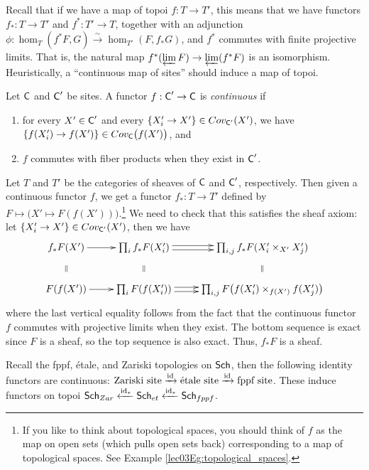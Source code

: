 
 Recall that if we have a map of topoi $f:T\to T'$, this means that we have functors
 $f_*:T\to T'$ and $f^*:T'\to T$, together with an adjunction
 $\phi:\hom_T(f^*F,G)\xrightarrow{\sim} \hom_{T'}(F,f_*G)$, and $f^*$ commutes with
 finite projective limits. That is, the natural map $f^* (\varprojlim F)\to
 \varprojlim(f^*F)$ is an isomorphism. Heuristically, a ``continuous map of sites''
 should induce a map of topoi.

 \begin{definition}
   Let $\text{\sf C}$ and $\text{\sf C}'$ be sites. A functor $f:\text{\sf C}'\to \text{\sf C}$ is \emph{continuous} if
   \begin{enumerate}
     \item for every $X'\in \text{\sf C}'$ and every $\{X_i'\to X'\}\in Cov_{\text{\sf C}'}(X')$,
     we have $\{f(X_i')\to f(X')\}\in Cov_{\text{\sf C}}\bigl(f(X')\bigr)$, and
     \item $f$ commutes with fiber products when they exist in $\text{\sf C}'$.
   \end{enumerate}
 \end{definition}
 Let $T$ and $T'$ be the categories of sheaves of $\text{\sf C}$ and $\text{\sf C}'$, respectively. Then
 given a continuous functor $f$, we get a functor $f_*:T\to T'$ defined by $F\mapsto
 \bigl(X'\mapsto F(f(X'))\bigr)$.\footnote{If you like to think about topological spaces,
 you should think of $f$ as the map on open sets (which pulls open sets back)
 corresponding to a map of topological spaces. See Example
 \ref{lec03Eg:topological_spaces}.} We need to check that this satisfies the sheaf axiom:
 let $\{X_i'\to X'\}\in Cov_{\text{\sf C}'}(X')$, then we have
  \[
   \xymatrix{
    f_*F(X') \ar[r] \ar@{}[d]|{\parallel} & \prod_i f_*F(X_i') \ar@{}[d]|{\parallel}\ar@<.5ex>[r] \ar@<-.5ex>[r] &
    \prod_{i,j} f_*F(X_i'\times_{X'} X_j') \ar@{}[d]|{\parallel}\\
    F(f(X')) \ar[r] & \prod_i F(f(X_i'))\ar@<.5ex>[r] \ar@<-.5ex>[r] & \prod_{i,j}
    F\bigl(f(X_i')\times_{f(X')}f(X_j')\bigr)}
 \]
  where the last vertical equality follows from the fact that the continuous functor $f$
 commutes with projective limits when they exist. The bottom sequence is exact since $F$
 is a sheaf, so the top sequence is also exact. Thus, $f_*F$ is a sheaf.
 \begin{example}
   Recall the fppf, \'etale, and Zariski topologies on $\text{\sf Sch}$, then the following
   identity functors are continuous:
   $\text{Zariski site}\xrightarrow{\operatorname{id}} \text{\'etale site}\xrightarrow{\operatorname{id}} \text{fppf
   site}$. These induce functors on topoi
   $\text{\sf Sch}_{Zar} \xleftarrow{\operatorname{id}_*} \text{\sf Sch}_{et} \xleftarrow{\operatorname{id}_*} \text{\sf Sch}_{fppf}$.
 \end{example}

